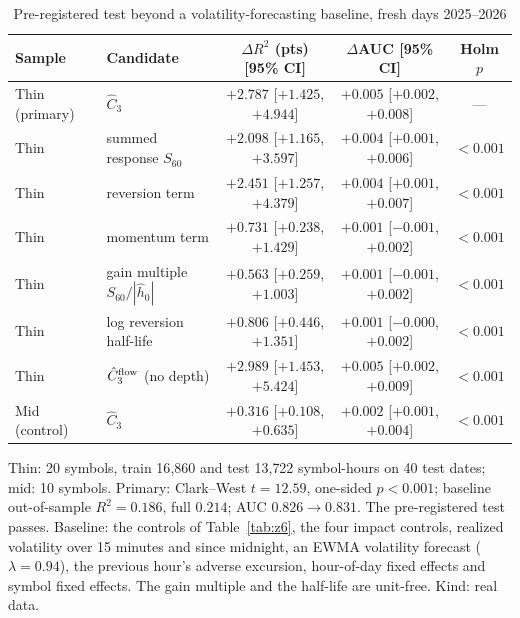 \begin{table}[t]\centering
\begin{threeparttable}
\caption{Pre-registered test beyond a volatility-forecasting baseline, fresh days 2025--2026}\label{tab:z9}
\small\setlength{\tabcolsep}{2.5pt}
\begin{tabular}{lp{}ccc}
\toprule
Sample & Candidate & $\Delta R^2$ (pts) [95\% CI] & $\Delta$AUC [95\% CI] & Holm $p$\\
\midrule
Thin (primary) & $\hat C_3$ & $+2.787$ [$+1.425$, $+4.944$] & $+0.005$ [$+0.002$, $+0.008$] & ---\\
Thin & summed response $S_{60}$ & $+2.098$ [$+1.165$, $+3.597$] & $+0.004$ [$+0.001$, $+0.006$] & $<0.001$\\
Thin & reversion term & $+2.451$ [$+1.257$, $+4.379$] & $+0.004$ [$+0.001$, $+0.007$] & $<0.001$\\
Thin & momentum term & $+0.731$ [$+0.238$, $+1.429$] & $+0.001$ [$-0.001$, $+0.002$] & $<0.001$\\
Thin & gain multiple $S_{60}/|\hat h_0|$ & $+0.563$ [$+0.259$, $+1.003$] & $+0.001$ [$-0.001$, $+0.002$] & $<0.001$\\
Thin & log reversion half-life & $+0.806$ [$+0.446$, $+1.351$] & $+0.001$ [$-0.000$, $+0.002$] & $<0.001$\\
Thin & $\hat C_3^{\rm flow}$ (no depth) & $+2.989$ [$+1.453$, $+5.424$] & $+0.005$ [$+0.002$, $+0.009$] & $<0.001$\\
Mid (control) & $\hat C_3$ & $+0.316$ [$+0.108$, $+0.635$] & $+0.002$ [$+0.001$, $+0.004$] & $<0.001$\\
\bottomrule
\end{tabular}
\begin{tablenotes}\footnotesize\item Thin: 20 symbols, train 16{,}860 and test 13{,}722 symbol-hours on 40 test dates; mid: 10 symbols. Primary: Clark--West $t=12.59$, one-sided $p<0.001$; baseline out-of-sample $R^2=0.186$, full $0.214$; AUC $0.826\to0.831$. The pre-registered test passes. Baseline: the controls of Table~\ref{tab:z6}, the four impact controls, realized volatility over 15 minutes and since midnight, an EWMA volatility forecast ($\lambda=0.94$), the previous hour's adverse excursion, hour-of-day fixed effects and symbol fixed effects. The gain multiple and the half-life are unit-free. Kind: real data.\end{tablenotes}
\end{threeparttable}
\end{table}

